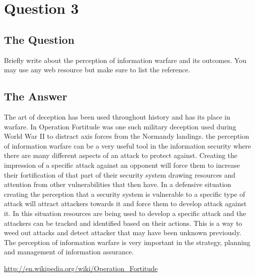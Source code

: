 \documentclass[11pt]{article}
\begin{document}
\section{\sc Question 3}

\subsection{The Question}

\begin{flushleft}

Briefly write about the perception of information warfare and its outcomes. You may use any web resource but make sure to list the reference.

\end{flushleft}


\subsection{The Answer}

\begin{flushleft}

The art of deception has been used throughout history and has its place in warfare. In Operation Fortitude was one such military deception used during World War II to distract axis forces from the Normandy landings. the perception of information warfare can be a very useful tool in the information security where there are many different aspects of an attack to protect against. Creating the impression of a specific attack against an opponent will force them to increase their fortification of that part of their security system drawing resources and attention from other vulnerabilities that then have. In a defensive situation creating the perception that a security system is vulnerable to a specific type of attack will attract attackers towards it and force them to develop attack against it. In this situation resources are being used to develop a specific attack and the attackers can be tracked and identified based on their actions. This is a way to weed out attacks and detect attacker that may have been unknown previously. The perception of information warfare is very important in the strategy, planning and management of information assurance. 




\url{http://en.wikipedia.org/wiki/Operation_Fortitude}

\end{flushleft}
\end{document}
